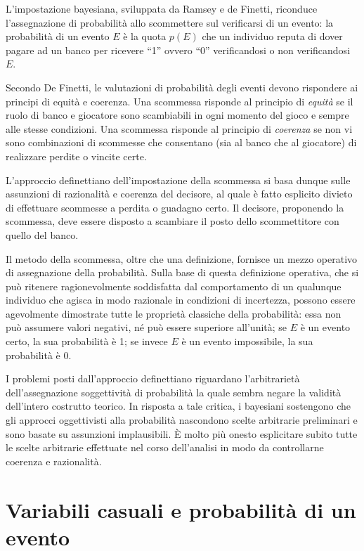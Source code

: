 \documentclass[
  11pt,
]{krantz}
\theoremstyle{definition}
\theoremstyle{definition}
\theoremstyle{definition}
\theoremstyle{definition}
\theoremstyle{remark}
\begin{document}
L'impostazione bayesiana, sviluppata da Ramsey e de Finetti, riconduce l'assegnazione di probabilità allo scommettere sul verificarsi di un evento: la probabilità di un evento \(E\) è la quota \(p(E)\) che un individuo reputa di dover pagare ad un banco per ricevere ``1'' ovvero ``0'' verificandosi o non verificandosi \(E\).

Secondo De Finetti, le valutazioni di probabilità degli eventi devono rispondere ai principi di equità e coerenza. Una scommessa risponde al principio di \emph{equità} se il ruolo di banco e giocatore sono scambiabili in ogni momento del gioco e sempre alle stesse condizioni. Una scommessa risponde al principio di \emph{coerenza} se non vi sono combinazioni di scommesse che consentano (sia al banco che al giocatore) di realizzare perdite o vincite certe.

L'approccio definettiano dell'impostazione della scommessa si basa dunque sulle assunzioni di razionalità e coerenza del decisore, al quale è fatto esplicito divieto di effettuare scommesse a perdita o guadagno certo. Il decisore, proponendo la scommessa, deve essere disposto a scambiare il posto dello scommettitore con quello del banco.

Il metodo della scommessa, oltre che una definizione, fornisce un mezzo operativo di assegnazione della probabilità. Sulla base di questa definizione operativa, che si può ritenere ragionevolmente soddisfatta dal comportamento di un qualunque individuo che agisca in modo razionale in condizioni di incertezza, possono essere agevolmente dimostrate tutte le proprietà classiche della probabilità: essa non può assumere valori negativi, né può essere superiore all'unità; se \(E\) è un evento certo, la sua probabilità è 1; se invece \(E\) è un evento impossibile, la sua probabilità è 0.

I problemi posti dall'approccio definettiano riguardano l'arbitrarietà dell'assegnazione soggettività di probabilità la quale sembra negare la validità dell'intero costrutto teorico. In risposta a tale critica, i bayesiani sostengono che gli approcci oggettivisti alla probabilità nascondono scelte arbitrarie preliminari e sono basate su assunzioni implausibili. È molto più onesto esplicitare subito tutte le scelte arbitrarie effettuate nel corso dell'analisi in modo da controllarne coerenza e razionalità.

\hypertarget{variabili-casuali-e-probabilituxe0-di-un-evento}{%
\section{Variabili casuali e probabilità di un evento}\label{variabili-casuali-e-probabilituxe0-di-un-evento}}
\end{document}
